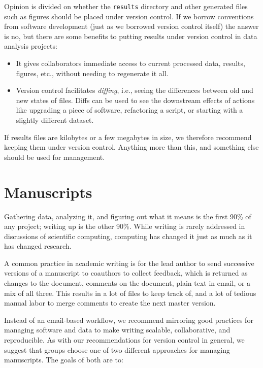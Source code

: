 \documentclass[10pt]{article}
\begin{document}
Opinion is divided on whether the \texttt{results} directory and other
generated files such as figures should be placed under version
control. If we borrow conventions from software development (just as
we borrowed version control itself) the answer is no, but there are
some benefits to putting results under version control in data
analysis projects:

\begin{itemize}

\item
  It gives collaborators immediate access to current processed data,
  results, figures, etc., without needing to regenerate it all.

\item
  Version control facilitates \emph{diffing}, i.e., seeing the
  differences between old and new states of files. Diffs can be used
  to see the downstream effects of actions like upgrading a piece of
  software, refactoring a script, or starting with a slightly
  different dataset.

\end{itemize}

If results files are kilobytes or a few megabytes in size, we
therefore recommend keeping them under version control. Anything more
than this, and something else should be used for management.

\section{Manuscripts}\label{sec:manuscripts}

Gathering data, analyzing it, and figuring out what it means is the
first 90\% of any project; writing up is the other 90\%. While writing
is rarely addressed in discussions of scientific computing, computing
has changed it just as much as it has changed research.

A common practice in academic writing is for the lead author to send
successive versions of a manuscript to coauthors to collect feedback,
which is returned as changes to the document, comments on the
document, plain text in email, or a mix of all three. This results in
a lot of files to keep track of, and a lot of tedious manual labor to
merge comments to create the next master version.

Instead of an email-based workflow, we recommend mirroring good
practices for managing software and data to make writing scalable,
collaborative, and reproducible.  As with our recommendations for
version control in general, we suggest that groups choose one of two
different approaches for managing manuscripts.  The goals of both are
to:
\end{document}
